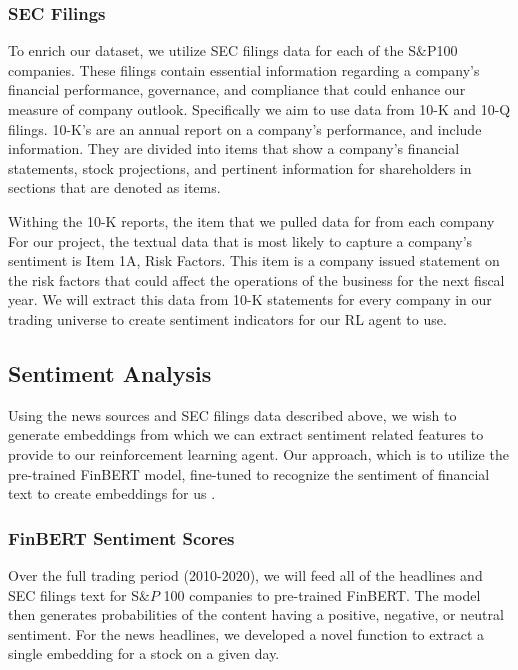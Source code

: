 \subsubsection{SEC Filings}

To enrich our dataset, we utilize SEC filings data for each of the S$\&$P100 companies. 
These filings contain essential information regarding a company's financial 
performance, governance, and compliance that could enhance our measure of 
company outlook. Specifically we aim to use data from 10-K and 10-Q filings. 
10-K’s are an annual report on a company’s performance, and include information. 
They are divided into items that show a company’s financial statements, 
stock projections, and pertinent information for shareholders in sections that 
are denoted as items. 

Withing the 10-K reports, the item that we pulled data for from each company  For our project, the textual data that is most likely to 
capture a company’s sentiment is Item 1A, Risk Factors. This item is a company 
issued statement on the risk factors that could affect the operations of the 
business for the next fiscal year. We will extract this data from 10-K statements 
for every company in our trading universe to create sentiment indicators for our 
RL agent to use. 

\subsection{Sentiment Analysis}

Using the news sources and SEC filings data described above, we wish to 
generate embeddings from which we can extract sentiment related features 
to provide to our reinforcement learning agent. Our approach, which is to utilize the pre-trained 
FinBERT model, fine-tuned to recognize the sentiment of financial text to 
create embeddings for us \cite{finbert}. 

\subsubsection{FinBERT Sentiment Scores}

Over the full trading period (2010-2020), we will feed all of the headlines and SEC filings text for S$\&P$ 100 companies to pre-trained FinBERT. 
The model then generates probabilities of the content having a positive, negative, or neutral sentiment. For the news headlines, we developed a novel function to extract a single embedding for a stock on a given day. 

